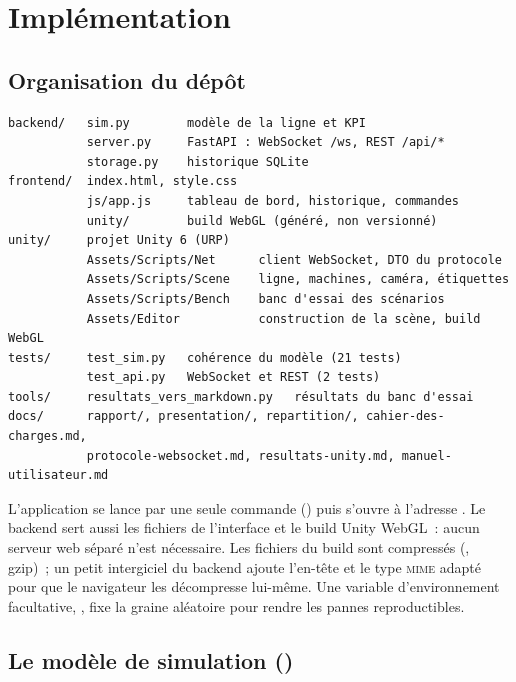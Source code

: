 \chapter{Implémentation}
\label{chap:implementation}

\section{Organisation du dépôt}

\begin{lstlisting}[language={}, numbers=none, caption={Arborescence du dépôt.}]
backend/   sim.py        modèle de la ligne et KPI
           server.py     FastAPI : WebSocket /ws, REST /api/*
           storage.py    historique SQLite
frontend/  index.html, style.css
           js/app.js     tableau de bord, historique, commandes
           unity/        build WebGL (généré, non versionné)
unity/     projet Unity 6 (URP)
           Assets/Scripts/Net      client WebSocket, DTO du protocole
           Assets/Scripts/Scene    ligne, machines, caméra, étiquettes
           Assets/Scripts/Bench    banc d'essai des scénarios
           Assets/Editor           construction de la scène, build WebGL
tests/     test_sim.py   cohérence du modèle (21 tests)
           test_api.py   WebSocket et REST (2 tests)
tools/     resultats_vers_markdown.py   résultats du banc d'essai
docs/      rapport/, presentation/, repartition/, cahier-des-charges.md,
           protocole-websocket.md, resultats-unity.md, manuel-utilisateur.md
\end{lstlisting}

L'application se lance par une seule commande () puis s'ouvre à l'adresse . Le backend sert aussi les fichiers de l'interface et le build Unity WebGL~: aucun serveur web séparé n'est nécessaire. Les fichiers du build sont compressés (, gzip)~; un petit intergiciel du backend ajoute l'en-tête  et le type \textsc{mime} adapté pour que le navigateur les décompresse lui-même. Une variable d'environnement facultative, , fixe la graine aléatoire pour rendre les pannes reproductibles.

\section{Le modèle de simulation ()}

